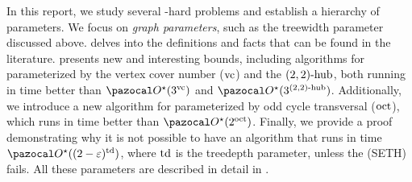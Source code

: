 In this report, we study several \NP-hard problems and establish a hierarchy of parameters. We focus on \textit{graph parameters}, such as the treewidth parameter discussed above.  delves into the definitions and facts that can be found in the literature.  presents new and interesting bounds, including algorithms for  parameterized by the vertex cover number ($\vc$) and the $\sdhub[2,2]$, both running in time better than $\O^\star(3^\vc)$ and $\O^\star(3^{\sdhub[2,2]})$. Additionally, we introduce a new algorithm for  parameterized by odd cycle transversal ($\oct$), which runs in time better than $\O^\star(2^\oct)$. Finally, we provide a proof demonstrating why it is not possible to have an algorithm that runs in time $\O^\star((2 - \varepsilon)^\td)$, where $\td$ is the treedepth parameter, unless the (SETH) fails. All these parameters are described in detail in .